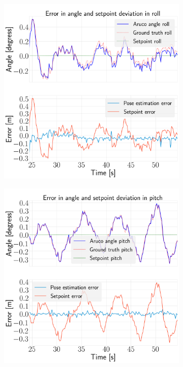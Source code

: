 \documentclass[../Head/report.tex]{subfiles}
\begin{document}
\begin{figure}[H]
    \centering
    \begin{subfigure}[t]{.30\textwidth}
        \centering
        \includegraphics[width=\textwidth]{../Figures/hold_pose_using_aruco_pose_estimation/test5_landingBoard3_noWind/error_roll/pose_error_roll_test1.png}
        \caption{}
        \label{fig:hold_pose_estimation_test5_roll}
    \end{subfigure}
     \hspace{0.2em}
    \begin{subfigure}[t]{.30\textwidth}
        \centering
        \includegraphics[width=\textwidth]{../Figures//hold_pose_using_aruco_pose_estimation/test5_landingBoard3_noWind/error_pitch/pose_error_pitch_test1.png}

\end{subfigure}
\end{figure}
\end{document}
